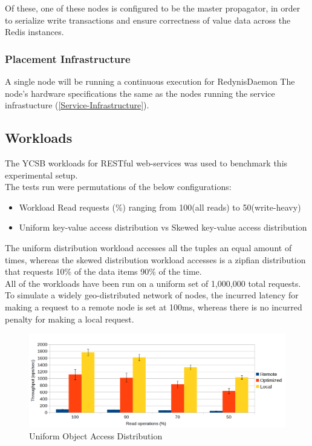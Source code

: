 \documentclass{sig-alternate}
\begin{document}
Of these, one of these nodes is configured to be the master propagator, in order to serialize write transactions and ensure correctness of value data across the Redis instances.\\

\subsubsection{Placement Infrastructure}
A single node will be running a continuous execution for RedynisDaemon \cite{redynis-daemon}
The node's hardware specifications the same as the nodes running the service infrastucture (\ref{Service-Infrastructure}).\\

\subsection{Workloads}
The YCSB workloads for RESTful web-services was used to benchmark this experimental setup.\\

The tests run were permutations of the below configurations:

\begin{itemize}
	\item  Workload Read requests (\%) ranging from 100(all reads) to 50(write-heavy)
	\item  Uniform key-value access distribution vs Skewed key-value access distribution
\end{itemize}

The uniform distribution workload accesses all the tuples an equal amount of times, whereas the skewed distribution workload accesses is a zipfian distribution that requests 10\% of the data items 90\% of the time.\\

All of the workloads have been run on a uniform set of 1,000,000 total requests. To simulate a widely geo-distributed network of nodes, the incurred latency for making a request to a remote node is set at 100ms\cite{latency-stats}, whereas there is no incurred penalty for making a local request.\\


\begin{figure}[ht]
\centering
\includegraphics[width=\textwidth]{images/Uniform-dist-throughput.png}
\caption{Uniform Object Access Distribution}
\label{fig:res-unif}
\end{figure}
\end{document}

